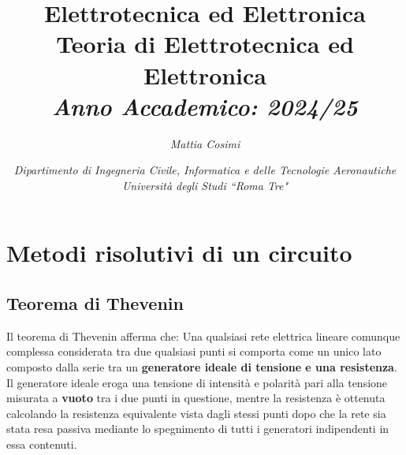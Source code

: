 \documentclass{article}
\numberwithin{equation}{subsection}
\begin{document}
\title{%
    \textbf{Elettrotecnica ed Elettronica}  \\ 
    \large Teoria di Elettrotecnica ed Elettronica\\
    \textit{Anno Accademico: 2024/25}}
\author{\textit{Mattia Cosimi}}
\date{\textit{Dipartimento di Ingegneria Civile, Informatica e delle Tecnologie Aeronautiche \\
Università degli Studi ``Roma Tre"}}

\maketitle


\clearpage

\pagestyle{fancy}
\fancyhead{}\fancyfoot{}
\fancyfoot[C]{\thepage}

\tableofcontents

\clearpage


\section{Metodi risolutivi di un circuito}
\subsection{Teorema di Thevenin}
Il teorema di Thevenin afferma che: 
Una qualsiasi rete elettrica lineare comunque complessa considerata tra due qualsiasi punti si comporta come un unico lato composto dalla serie tra un \textbf{generatore ideale di tensione e una resistenza}. Il generatore ideale eroga una tensione di intensità e polarità pari alla tensione misurata a \textbf{vuoto} tra i due punti in questione, mentre la resistenza è ottenuta calcolando la resistenza equivalente vista dagli stessi punti dopo che la rete sia stata resa passiva mediante lo spegnimento di tutti i generatori indipendenti in essa contenuti.
\end{document}
